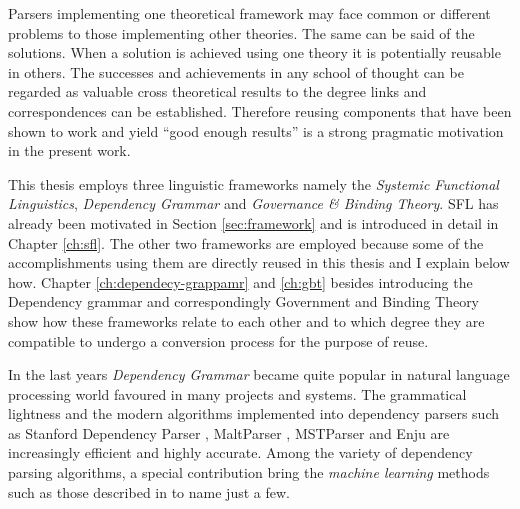 Parsers implementing one theoretical framework may face common or different problems to those implementing other theories. The same can be said of the solutions. When a solution is achieved using one theory it is potentially reusable in others. The successes and achievements in any school of thought can be regarded as valuable cross theoretical results to the degree links and correspondences can be established. Therefore reusing components that have been shown to work and yield ``good enough results'' is a strong pragmatic motivation in the present work.

%
This thesis employs three linguistic frameworks namely the \textit{Systemic Functional Linguistics}, \textit{Dependency Grammar} and \textit{Governance \& Binding Theory}. SFL has already been motivated in Section \ref{sec:framework} and is introduced in detail in Chapter \ref{ch:sfl}. The other two frameworks are employed because some of the accomplishments using them are directly reused in this thesis and I explain below how. Chapter \ref{ch:dependecy-grappamr} and \ref{ch:gbt} besides introducing the Dependency grammar and correspondingly Government and Binding Theory show how these frameworks relate to each other and to which degree they are compatible to undergo a conversion process for the purpose of reuse.


%
In the last years \textit{Dependency Grammar} \citep{Tesniere2015} became quite popular in natural language processing world favoured in many projects and systems. The grammatical lightness and the  modern algorithms implemented into dependency parsers such as Stanford Dependency Parser \citep{Marneffe2006}, MaltParser \citep{Nivre2006}, MSTParser \citep{McDonald2006} and Enju \citep{Miyao2005} are increasingly efficient and highly accurate. Among the variety of dependency parsing algorithms, a special contribution bring the \textit{machine learning} methods such as those described in \citet{mcdonald2005online, mcdonald2006online, carreras2007experiments, zhang2011transition, pei2015effective} to name just a few. 

